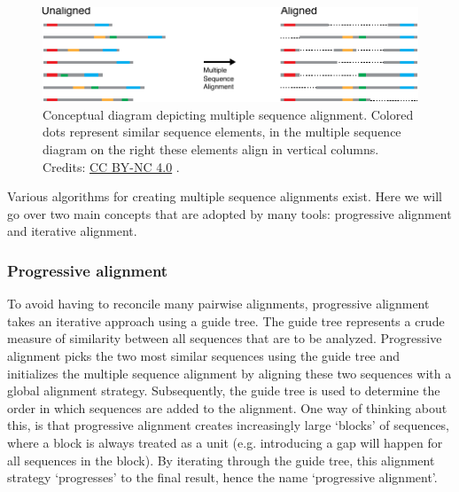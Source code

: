 \begin{figure}[!htbp]
\centering
\includegraphics[width=0.8\linewidth]{files/msa-efb05f944d68f64bc1622ab87c647c51.pdf}
\caption[]{Conceptual diagram depicting multiple sequence alignment. Colored dots represent similar sequence elements, in the multiple sequence diagram on the right these elements align in vertical columns. Credits: \href{https://creativecommons.org/licenses/by-nc/4.0/}{CC BY-NC 4.0} \cite{own_2_2024}.}
\label{msa_concept}
\end{figure}


Various algorithms for creating multiple sequence alignments exist. Here we will go over two main concepts that are adopted by many tools: progressive alignment and iterative alignment.

\subsubsection{Progressive alignment}

To avoid having to reconcile many pairwise alignments, progressive alignment takes an iterative approach using a guide tree. The guide tree represents a crude measure of similarity between all sequences that are to be analyzed. Progressive alignment picks the two most similar sequences using the guide tree and initializes the multiple sequence alignment by aligning these two sequences with a global alignment strategy. Subsequently, the guide tree is used to determine the order in which sequences are added to the alignment. One way of thinking about this, is that progressive alignment creates increasingly large `blocks' of sequences, where a block is always treated as a unit (e.g. introducing a gap will happen for all sequences in the block). By iterating through the guide tree, this alignment strategy `progresses' to the final result, hence the name `progressive alignment'.

